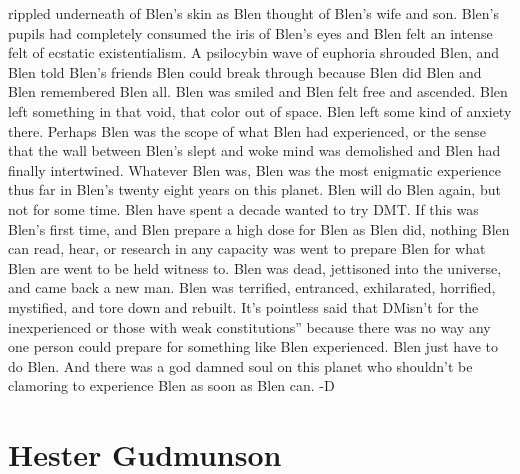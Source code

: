 \documentclass[12pt]{book}
\begin{document}
rippled underneath of Blen's skin as Blen thought of Blen's wife and son. Blen's pupils had completely consumed the iris of Blen's eyes and Blen felt an intense felt of ecstatic existentialism. A psilocybin wave of euphoria shrouded Blen, and Blen told Blen's friends Blen could break through because Blen did Blen and Blen remembered Blen all. Blen was smiled and Blen felt free and ascended. Blen left something in that void, that color out of space. Blen left some kind of anxiety there. Perhaps Blen was the scope of what Blen had experienced, or the sense that the wall between Blen's slept and woke mind was demolished and Blen had finally intertwined. Whatever Blen was, Blen was the most enigmatic experience thus far in Blen's twenty eight years on this planet. Blen will do Blen again, but not for some time. Blen have spent a decade wanted to try DMT. If this was Blen's first time, and Blen prepare a high dose for Blen as Blen did, nothing Blen can read, hear, or research in any capacity was went to prepare Blen for what Blen are went to be held witness to. Blen was dead, jettisoned into the universe, and came back a new man. Blen was terrified, entranced, exhilarated, horrified, mystified, and tore down and rebuilt. It's pointless said that DMisn't for the inexperienced or those with weak constitutions'' because there was no way any one person could prepare for something like Blen experienced. Blen just have to do Blen. And there was a god damned soul on this planet who shouldn't be clamoring to experience Blen as soon as Blen can. -D



\chapter{Hester Gudmunson}
\end{document}
